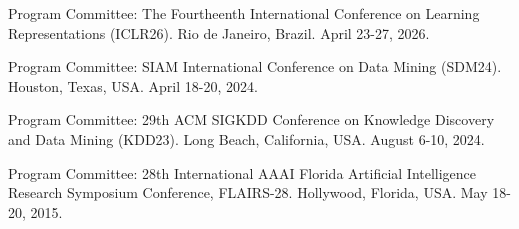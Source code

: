 \begin{innerlist}
  \item[-] Program Committee: The Fourtheenth International Conference on Learning Representations (ICLR26).
  Rio de Janeiro, Brazil.
  April 23-27, 2026.

  \item[-] Program Committee: SIAM International Conference on Data Mining (SDM24).
  Houston, Texas, USA.
  April 18-20, 2024.

  \item[-] Program Committee: 29th ACM SIGKDD Conference on Knowledge Discovery and Data Mining (KDD23).
  Long Beach, California, USA.
  August 6-10, 2024.

  \item[-] Program Committee: 28th International AAAI Florida Artificial Intelligence Research Symposium Conference,
  FLAIRS-28.
  Hollywood, Florida, USA.
  May 18-20, 2015.
\end{innerlist}
